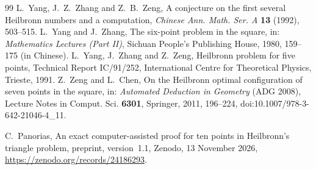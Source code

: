 \documentclass[11pt]{amsart}
\theoremstyle{definition}
\begin{document}
\begin{thebibliography}{99}
 L.~Yang, J.~Z.~Zhang and Z.~B.~Zeng, A conjecture on the first several Heilbronn numbers and a computation, \emph{Chinese Ann. Math. Ser. A} \textbf{13} (1992), 503--515.
 L.~Yang and J.~Zhang, The six-point problem in the square, in: \emph{Mathematics Lectures (Part II)}, Sichuan People's Publishing House, 1980, 159--175 (in Chinese).
 L.~Yang, J.~Zhang and Z.~Zeng, Heilbronn problem for five points, Technical Report IC/91/252, International Centre for Theoretical Physics, Trieste, 1991.
 Z.~Zeng and L.~Chen, On the Heilbronn optimal configuration of seven points in the square, in: \emph{Automated Deduction in Geometry} (ADG 2008), Lecture Notes in Comput. Sci. \textbf{6301}, Springer, 2011, 196--224, doi:10.1007/978-3-642-21046-4\_11.

 C.~Panorias, An exact computer-assisted proof for ten points in Heilbronn's triangle problem, preprint, version~1.1, Zenodo, 13 November 2026, \url{https://zenodo.org/records/24186293}.
\end{thebibliography}
\end{document}
